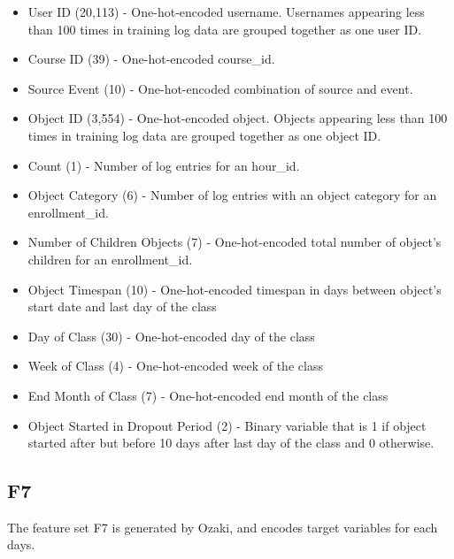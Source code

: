 \begin{itemize}
  \setlength\itemsep{0em}
  \item User ID (20,113) - One-hot-encoded username. Usernames appearing less than 100 times in training log data are grouped together as one user ID. 
  \item Course ID (39) - One-hot-encoded course\_id.
  \item Source Event (10) - One-hot-encoded combination of source and event.
  \item Object ID (3,554) - One-hot-encoded object.  Objects appearing less than 100 times in training log data are grouped together as one object ID.
  \item Count (1) - Number of log entries for an hour\_id.
  \item Object Category (6) - Number of log entries with an object category for an enrollment\_id.
  \item Number of Children Objects (7) - One-hot-encoded total number of object's children for an enrollment\_id.
  \item Object Timespan (10) - One-hot-encoded timespan in days between object's start date and last day of the class
  \item Day of Class (30) - One-hot-encoded day of the class
  \item Week of Class (4) - One-hot-encoded week of the class
  \item End Month of Class (7) - One-hot-encoded end month of the class
  \item Object Started in Dropout Period (2) - Binary variable that is 1 if object started after but before 10 days after last day of the class and 0 otherwise.
\end{itemize}

\subsection{F7}

The feature set F7 is generated by Ozaki, and encodes target variables for each days.

